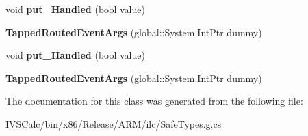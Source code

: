 \begin{DoxyCompactItemize}
void {\bfseries put\+\_\+\+Handled} (bool value)
\item 
\mbox{\label{class_windows_1_1_u_i_1_1_xaml_1_1_input_1_1_tapped_routed_event_args_a22e094d8fdd112ca2dcbedc475514bae}} 
{\bfseries Tapped\+Routed\+Event\+Args} (global\+::\+System.\+Int\+Ptr dummy)
\item 
\mbox{\label{class_windows_1_1_u_i_1_1_xaml_1_1_input_1_1_tapped_routed_event_args_a692a7af105762ecd090105546e768f65}} 
void {\bfseries put\+\_\+\+Handled} (bool value)
\item 
\mbox{\label{class_windows_1_1_u_i_1_1_xaml_1_1_input_1_1_tapped_routed_event_args_a22e094d8fdd112ca2dcbedc475514bae}} 
{\bfseries Tapped\+Routed\+Event\+Args} (global\+::\+System.\+Int\+Ptr dummy)
\end{DoxyCompactItemize}


The documentation for this class was generated from the following file\+:\begin{DoxyCompactItemize}
\item 
I\+V\+S\+Calc/bin/x86/\+Release/\+A\+R\+M/ilc/Safe\+Types.\+g.\+cs\end{DoxyCompactItemize}
